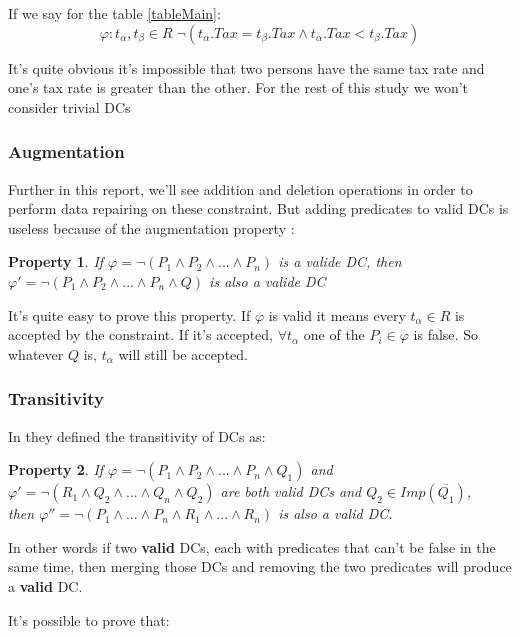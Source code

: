 \documentclass[letterpaper, 12pt]{report}
\newtheorem{myprop}{Property}
\begin{document}
If we say for the table \ref{tableMain}:
$$\varphi : t_\alpha,t_\beta \in R \; \neg(t_\alpha.Tax = t_\beta.Tax \wedge t_\alpha.Tax < t_\beta.Tax)$$

It's quite obvious it's impossible that two persons have the same tax rate and one's tax rate is greater than the other. For the rest of this study we won't consider trivial DCs

\subsubsection{Augmentation}

Further in this report, we'll see addition and deletion operations in order to perform data repairing on these constraint. But adding predicates to valid DCs is useless because of the augmentation property \cite{DCs}:

\begin{myprop}
	If $\varphi = \neg (P_1 \wedge P_2 \wedge ... \wedge P_n)$ is a valide DC, then $\varphi ' = \neg(P_1 \wedge P_2 \wedge ... \wedge P_n \wedge Q)$ is also a valide DC
\end{myprop}

It's quite easy to prove this property. If $\varphi$ is valid it means every $t_\alpha \in R$ is accepted by the constraint. If it's accepted, $\forall t_\alpha$ one of the $P_i \in \varphi$ is false. So whatever $Q$ is, $t_\alpha$ will still be accepted.

\subsubsection{Transitivity}
In \cite{DCs} they defined the transitivity of DCs as:

\begin{myprop}
	If $\varphi = \neg (P_1 \wedge P_2 \wedge ... \wedge P_n \wedge Q_1)$ and $\varphi ' = \neg (R_1 \wedge Q_2 \wedge ... \wedge Q_n \wedge Q_2)$ are both valid DCs and $Q_2 \in Imp(\overline{Q_1})$, \\ then $ \varphi '' = \neg(P_1 \wedge ... \wedge P_n \wedge R_1 \wedge ... \wedge R_n)$ is also a valid DC.
\end{myprop}

In other words if two \textbf{valid} DCs, each with predicates that can't be false in the same time, then merging those DCs and removing the two predicates will produce a \textbf{valid} DC.

It's possible to prove that:
\end{document}
